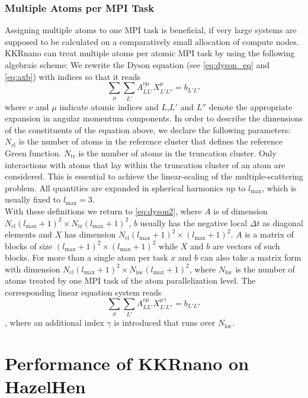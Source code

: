 \documentclass [a4paper, 12pt]{article}
\newcommand{\beq}{\begin{equation}}
\newcommand{\eeq}{\end{equation}}
\begin{document}
\subsubsection*{Multiple Atoms per MPI Task}

Assigning multiple atoms to one MPI task is beneficial, if very large systems are
supposed to be calculated on a comparatively small allocation of compute nodes.
\\
KKRnano can treat multiple atoms per atomic MPI task by using the following algebraic scheme: 
We rewrite the Dyson equation (see \cref{eq:dyson_eq} and \cref{eq:axb}) with indices so that it reads
\beq
\sum_{\mu} \sum_{L'} A^{\nu \mu}_{LL'} X^{\mu}_{L'L''} = b_{L'L''}
\label{eq:dyson2}
\eeq
where $\nu$ and $\mu$ indicate atomic indices and $L$,$L'$ and $L''$ denote
the appropriate expansion in angular momentum components.
In order to describe the dimensions of the constituents of the equation above, we
declare the following parameters:
$N_{\text{cl}}$ is the number of atoms in the reference cluster that defines the reference Green function.
$N_{\text{tr}}$ is the number of atoms in the truncation cluster. Only interactions with atoms that lay 
within the truncation cluster of an atom are considered. This is essential to achieve
the linear-scaling of the multiple-scattering problem. 
All quantities are expanded in spherical harmonics up to $l_{\text{max}}$, which is usually fixed to
$l_{\text{max}}=3$.
\\
With these definitions we return to \cref{eq:dyson2}, where $A$ is of dimension 
$N_{\text{cl}} (l_{\text{max}}+1)^2 \times N_{\text{tr}} (l_{\text{max}}+1)^2$,
$b$ usually has the
negative local $\Delta t$ as diagonal elements
and $X$ has dimension $N_{\text{cl}} (l_{\text{max}}+1)^2 \times (l_{\text{max}}+1)^2$.
$A$ is a matrix of blocks of size ${(l_{\text{max}}+1)}^2 \times {(l_{\text{max}}+1)}^2$
while $X$ and $b$ are vectors
of such blocks. For more than a single atom per task $x$ and $b$ can also take a matrix form
with dimension $N_{\text{cl}} (l_{\text{max}}+1)^2 \times N_{\text{loc}} (l_{\text{max}}+1)^2$, where
$N_{\text{loc}}$ is the number of atoms treated by one MPI task of the atom parallelization level.
The corresponding linear equation system reads
\beq
\label{eq:dyson_equation_lap_multi}
\sum_{\mu} \sum_{L'} A^{\nu \mu}_{LL'} X^{\mu \gamma}_{L'L''} = b_{L'L''}
\eeq
, where an additional index $\gamma$ is introduced that runs over $N_{\text{loc}}$. 

\section{Performance of KKRnano on HazelHen}
\label{sec:performance}
\end{document}
